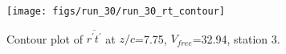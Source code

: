 \begin{figure}[H]
\centering
\texttt{[image: figs/run\_30/run\_30\_rt\_contour]}
\caption{Contour plot of $\overline{r^\prime t^\prime}$ at $z/c$=7.75, $V_{free}$=32.94, station 3.}
\label{fig:run_30_rt_contour}
\end{figure}


